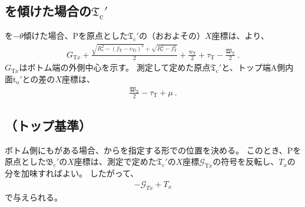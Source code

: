 \subsection[\Table を傾けた場合の\texorpdfstring{$\mathfrak T_\mathrm c'$}{Tc'}]
           {\Table を傾けた場合の$\boldsymbol{\mathfrak T_\mathrm c'}$}
\Table を$-\theta$傾けた場合、\TableCenter Pを原点とした\TopOutcutCenter$\mathfrak T_\mathrm c'$の（おおよその）$X$座標は、より、
\begin{align}
  \label{eq:gaisakucenterTt}
  G_{\mathrm Tx}+\frac{\sqrt{R_\mathrm c^2-(f_\mathrm T-c_\mathrm{Ti})^2}+\sqrt{R_\mathrm c^2-f_\mathrm T^2}}2
  +\frac{w_\mathrm T}2+\tau_\mathrm T-\frac{\mathfrak W_\mathrm T}2\ .
\end{align}
$G_{\mathrm Tx}$はボトム端の外側中心を示す。
測定して定めた原点$\mathfrak T_\mathrm c'$と、トップ端A側内面t$_\mathrm o'$との差の$X$座標は、
\begin{align}
  \label{eq:gaisakucenterTr}
  \frac{\mathfrak W_\mathrm T}2-\tau_\mathrm T+\mu~.
\end{align}


\subsection{\BottomOutcutCenter（トップ基準）}
ボトム側にも\Outcut がある場合、\TopOutcutCenter から\CenterlineEndFaceDifAC を指定する形で\BottomOutcutCenter の位置を決める。
このとき、\TableCenter Pを原点とした\BottomOutcutCenter$\mathfrak B_\mathrm c'$の$X$座標は、測定で定めた$\mathfrak T_\mathrm c'$の$X$座標$\mathcal G_{\mathrm Tx}$の符号を反転し、\CenterlineEndFaceDifAC$T_x$の分を加味すればよい。
したがって、
\begin{align}
  \label{eq:TbasedTx}
  -\mathcal G_{Tx}+T_x
\end{align}
で与えられる。



